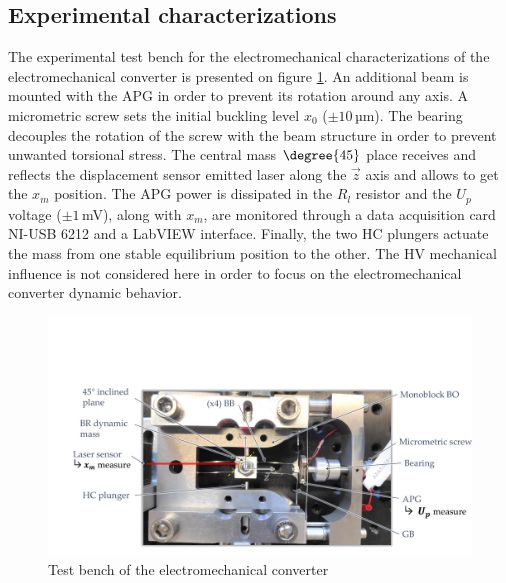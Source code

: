 \documentclass[3p,twocolumn,preprint]{elsarticle}
\begin{document}
	\subsection{Experimental characterizations}	
	\label{subsec:Experimental characterizations}
The experimental test bench for the electromechanical characterizations of the electromechanical converter is presented on figure \ref{fig:BDT_OB+GPA}. An additional beam is mounted with the APG in order to prevent its rotation around any axis. A micrometric screw sets the initial buckling level $x_0$ ($\pm 10$\,µm). The bearing decouples the rotation of the screw with the beam structure in order to prevent unwanted torsional stress. The central mass $\degree{45}$ place receives and reflects the displacement sensor emitted laser along the $\vec{z}$ axis and allows to get the $x_m$ position. The APG power is dissipated in the $R_l$ resistor and the $U_p$ voltage ($\pm 1$\,mV), along with $x_m$, are monitored through a data acquisition card NI-USB 6212 and a LabVIEW interface. Finally, the two HC plungers actuate the mass from one stable equilibrium position to the other. The HV mechanical influence is not considered here in order to focus on the electromechanical converter dynamic behavior. 
\begin{figure}[!htbp]
	\centering
	\captionsetup{justification=centering}
	\includegraphics[trim={2cm 0cm 0cm 5.5cm},clip,width=\linewidth]{figures/BDT_OB+GPA.pdf}
	\caption{Test bench of the electromechanical converter}
	\label{fig:BDT_OB+GPA}
\end{figure}
\end{document}
